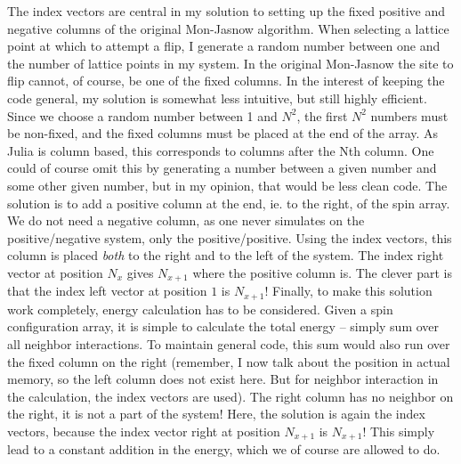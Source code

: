 \documentclass[12pt, a4paper]{article}
\begin{document}
The index vectors are central in my solution to setting up the fixed positive and negative columns of the original Mon-Jasnow algorithm.
When selecting a lattice point at which to attempt a flip, I generate a random number between one and the number of lattice points in my system.
In the original Mon-Jasnow the site to flip cannot, of course, be one of the fixed columns.
In the interest of keeping the code general, my solution is somewhat less intuitive, but still highly efficient.
Since we choose a random number between 1 and $N^2$, the first $N^2$ numbers must be non-fixed, and the fixed columns must be placed at the end of the array.
As Julia is column based, this corresponds to columns after the Nth column.
One could of course omit this by generating a number between a given number and some other given number, but in my opinion, that would be less clean code.
The solution is to add a positive column at the end, ie. to the right, of the spin array.
We do not need a negative column, as one never simulates on the positive/negative system, only the positive/positive.
Using the index vectors, this column is placed \emph{both} to the right and to the left of the system.
The index right vector at position $N_x$ gives $N_{x+1}$ where the positive column is.
The clever part is that the index left vector at position $1$ is $N_{x+1}$!
Finally, to make this solution work completely, energy calculation has to be considered.
Given a spin configuration array, it is simple to calculate the total energy -- simply sum over all neighbor interactions.
To maintain general code, this sum would also run over the fixed column on the right (remember, I now talk about the position in actual memory, so the left column does not exist here. But for neighbor interaction in the calculation, the index vectors are used).
The right column has no neighbor on the right, it is not a part of the system!
Here, the solution is again the index vectors, because the index vector right at position $N_{x+1}$ is $N_{x+1}$!
This simply lead to a constant addition in the energy, which we of course are allowed to do.
\end{document}
